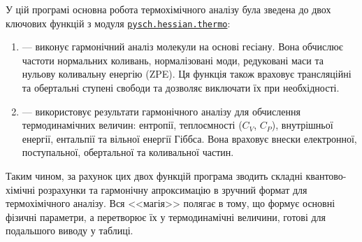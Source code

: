{


У цій програмі основна робота термохімічного аналізу була зведена до двох ключових функцій з модуля \href{https://pyscf.org/_modules/pyscf/hessian/thermo.html}{\texttt{pysch.hessian.thermo}}:

\begin{enumerate}
  \item {} --- виконує гармонічний аналіз молекули на основі гесіану.
        Вона обчислює частоти нормальних коливань, нормалізовані моди, редуковані маси та нульову коливальну енергію (ZPE).
        Ця функція також враховує трансляційні та обертальні ступені свободи та дозволяє виключати їх при необхідності.
  \item {} --- використовує результати гармонічного аналізу для обчислення термодинамічних величин:
        ентропії, теплоємності ($C_V$, $C_P$), внутрішньої енергії, ентальпії та вільної енергії Гіббса.
        Вона враховує внески електронної, поступальної, обертальної та коливальної частин.
\end{enumerate}

Таким чином, за рахунок цих двох функцій програма зводить складні квантово-хімічні розрахунки та гармонічну апроксимацію в зручний формат для термохімічного аналізу.
Вся <<магія>> полягає в тому, що  формує основні фізичні параметри, а  перетворює їх у термодинамічні величини, готові для подальшого виводу у таблиці.






}
